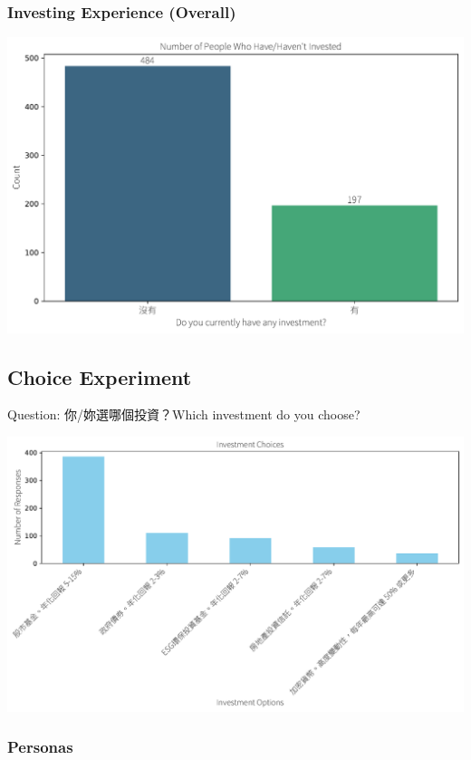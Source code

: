 \documentclass[
  letterpaper,
  DIV=11,
  numbers=noendperiod]{scrartcl}
\begin{document}
\subsubsection{Investing Experience
(Overall)}\label{investing-experience-overall}

\includegraphics{_thesis_files/figure-pdf/cell-75-output-1.pdf}

\subsection{Choice Experiment}\label{choice-experiment}

Question: 你/妳選哪個投資？Which investment do you choose?

\includegraphics{_thesis_files/figure-pdf/cell-76-output-1.pdf}

\newpage

\subsubsection{Personas}\label{personas}
\end{document}
